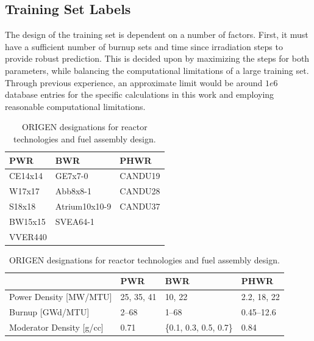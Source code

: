 \subsection{Training Set Labels}
\label{sec:snflbls}

The design of the training set is dependent on a number of factors.  First, it
must have a sufficient number of burnup sets and time since irradiation steps
to provide robust prediction. This is decided upon by maximizing the steps for
both parameters, while balancing the computational limitations of a large
training set. Through previous experience, an approximate limit would be around
$1e6$ database entries for the specific calculations in this work and employing
reasonable computational limitations.

\begin{table}[!htb]
  \centering
  \begin{subtable}{\linewidth}
    \centering
    \begin{tabular}{@{}lll@{}}
    \toprule
      \textbf{PWR} & \textbf{BWR}  & \textbf{PHWR} \\ \toprule
      CE14x14      & GE7x7-0       & CANDU19       \\
      W17x17       & Abb8x8-1      & CANDU28       \\
      S18x18       & Atrium10x10-9 & CANDU37       \\
      BW15x15      & SVEA64-1      &               \\
      VVER440      &               &               \\ \bottomrule
    \end{tabular}
    \caption{\gls{ORIGEN} designations for reactor technologies and fuel assembly design.}
    \label{tbl:rxtrtype}
    \vspace*{5mm}
  \end{subtable}
  \begin{subtable}{\linewidth}
    \centering
    \begin{tabular}{@{}llll@{}}
      \toprule
                              & \textbf{PWR}                     & \textbf{BWR}                     & \textbf{PHWR} \\ \toprule
      Power Density [MW/MTU]  & 25, 35, 41                       & 10, 22                           & 2.2, 18, 22   \\
      Burnup [GWd/MTU]        & 2--68                            & 1--68                            & 0.45--12.6    \\
      Moderator Density [g/cc]& 0.71                             & \{0.1, 0.3, 0.5, 0.7\}           & 0.84          \\

\end{tabular}
\end{subtable}
\end{table}

